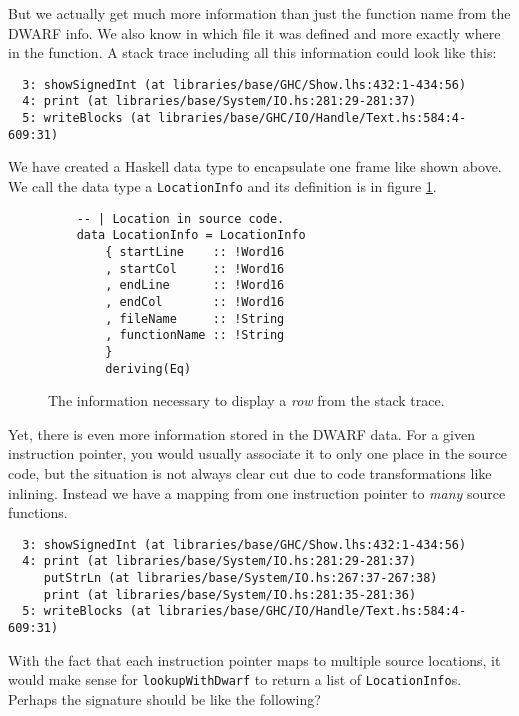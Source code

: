 But we actually get much more information than just the function name
from the DWARF info. We also know in which file it was defined and more
exactly where in the function. A stack trace including all this
information could look like this:

\begin{verbatim}
  3: showSignedInt (at libraries/base/GHC/Show.lhs:432:1-434:56)
  4: print (at libraries/base/System/IO.hs:281:29-281:37)
  5: writeBlocks (at libraries/base/GHC/IO/Handle/Text.hs:584:4-609:31)
\end{verbatim}

We have created a Haskell data type to encapsulate one frame like shown
above. We call the data type a \texttt{LocationInfo} and its definition
is in figure \ref{fig:location_info}.

\begin{figure}
\begin{mdframed}
  \begin{verbatim}
    -- | Location in source code.
    data LocationInfo = LocationInfo
        { startLine    :: !Word16
        , startCol     :: !Word16
        , endLine      :: !Word16
        , endCol       :: !Word16
        , fileName     :: !String
        , functionName :: !String
        }
        deriving(Eq)
  \end{verbatim}
  \caption{The information necessary to display a \emph{row} from the stack
    trace.}
  \label{fig:location_info}
\end{mdframed}
\end{figure}

Yet, there is even more information stored in the DWARF data. For a
given instruction pointer, you would usually associate it to only one
place in the source code, but the situation is not always clear cut due
to code transformations like inlining. Instead we have a
mapping from one instruction pointer to \emph{many} source functions.

\begin{verbatim}
  3: showSignedInt (at libraries/base/GHC/Show.lhs:432:1-434:56)
  4: print (at libraries/base/System/IO.hs:281:29-281:37)
     putStrLn (at libraries/base/System/IO.hs:267:37-267:38)
     print (at libraries/base/System/IO.hs:281:35-281:36)
  5: writeBlocks (at libraries/base/GHC/IO/Handle/Text.hs:584:4-609:31)
\end{verbatim}

With the fact that each instruction pointer maps to multiple
source locations, it would make sense for \texttt{lookupWithDwarf} to
return a list of \texttt{LocationInfo}s.
Perhaps the signature should be like the following?

